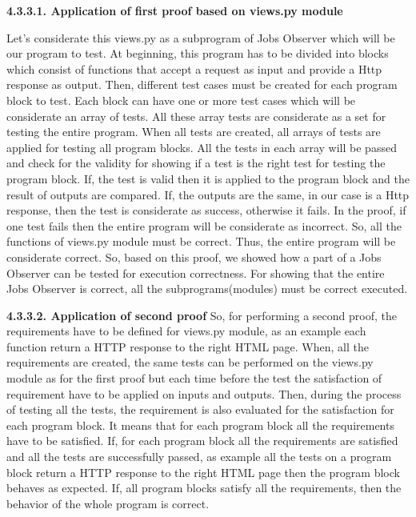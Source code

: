 \documentclass[conference,compsoc]{IEEEtran}
\begin{document}
\noindent
\newline
\textbf{4.3.3.1. Application of first proof based on views.py module}

Let's considerate this views.py as a subprogram of Jobs Observer which will be our program to test. At beginning, this program has to be divided into blocks which consist of functions that accept a request as input and provide a Http response as output. 
\newline                                                                                                                                                   
Then, different test cases must be created for each program block to test. Each block can have one or more test cases which will be considerate an array of tests. All these array tests are considerate as a set for testing the entire program.  
\newline                                                                                                                                     
When all tests are created, all arrays of tests are applied for testing all program blocks. All the tests in each array will be passed and check for the validity for showing if a test is the right test for testing the program block. If, the test is valid then it is applied to the program block and the result of outputs are compared. If, the outputs are the same, in our case is a Http response, then the test is considerate as success, otherwise it fails. \newline
In the proof, if one test fails then the entire program will be considerate as incorrect. So, all the functions of views.py module must be correct. Thus, the entire program will be considerate correct. So, based on this proof, we showed how a part of a Jobs Observer can be tested for execution correctness.
\newline
For showing that the entire Jobs Observer is correct, all the subprograms(modules) must be correct executed. 

\noindent
\newline
\textbf{4.3.3.2. Application of second proof}
So, for performing a second proof, the requirements have to be defined for views.py module, as an example each function return a HTTP response to the right HTML page.
\newline
When, all the requirements are created, the same tests can be performed on the views.py module as for the first proof but each time before the test the satisfaction of requirement have to be applied on inputs and outputs. Then, during the process of testing all the tests, the requirement is also evaluated for the satisfaction for each program block. It means that for each program block all the requirements have to be satisfied. If, for each program block all the requirements are satisfied and all the tests are successfully passed, as example all the tests on a program block return a HTTP response to the right HTML page then the program block behaves as expected. If, all program blocks satisfy all the requirements, then the behavior of the whole program is correct. 
                                                                                                                                          
\end{document}
